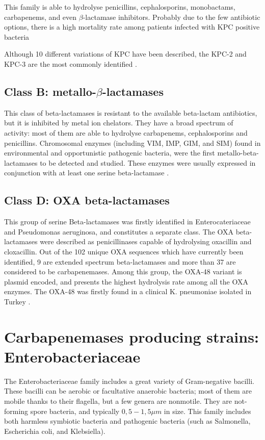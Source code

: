 \documentclass[11pt]{report}
\begin{document}
This family is able to hydrolyse penicillins, cephalosporins, monobactams, carbapenems, and even $\beta$-lactamase inhibitors.
Probably due to the few antibiotic options, there is a high mortality rate among patients infected with KPC positive bacteria \cite{MunozPrice2013}

Although 10 different variations of KPC have been described, the KPC-2 and KPC-3 are the most commonly identified \cite{WaltherRasmussen2007}.

\section {Class B: metallo-$\beta$-lactamases}
This class of beta-lactamases is resistant to the available beta-lactam antibiotics, but it is inhibited by metal ion chelators.
They have a broad spectrum of activity: most of them are able to hydrolyse carbapenems, cephalosporins and penicillins.
Chromosomal enzymes (including VIM, IMP, GIM, and SIM) found in environmental and opportunistic pathogenic bacteria, were the first metallo-beta-lactamases to be detected and studied.
These enzymes were usually expressed in conjunction with at least one serine beta-lactamase \cite{Queenan2007}.

\section{Class D: OXA beta-lactamases}
This group of serine Beta-lactamases was firstly identified in Enterocateriaceae and Pseudomonas aeruginosa, and constitutes a separate class.
The OXA beta-lactamases were described as penicillinases capable of hydrolysing oxacillin and cloxacillin.
Out of the 102 unique OXA sequences which have currently been identified, 9 are extended spectrum beta-lactamases and more than 37 are considered to be carbapenemases.
Among this group, the OXA-48 variant is plasmid encoded, and presents the highest hydrolysis rate among all the OXA enzymes.
The OXA-48 was firstly found in a clinical K. pneumoniae isolated in Turkey \cite{Poirel2012}.

\chapter{Carbapenemases producing strains: Enterobacteriaceae}
The Enterobacteriaceae family includes a great variety of Gram-negative bacilli.
These bacilli can be aerobic or facultative anaerobic bacteria; most of them are mobile thanks to their flagella, but a few genera are nonmotile.
They are not-forming spore bacteria, and typically $0,5-1,5\mu m$ in size.
This family includes both harmless symbiotic bacteria and pathogenic bacteria (such as Salmonella, Escherichia coli, and Klebsiella).
\end{document}

